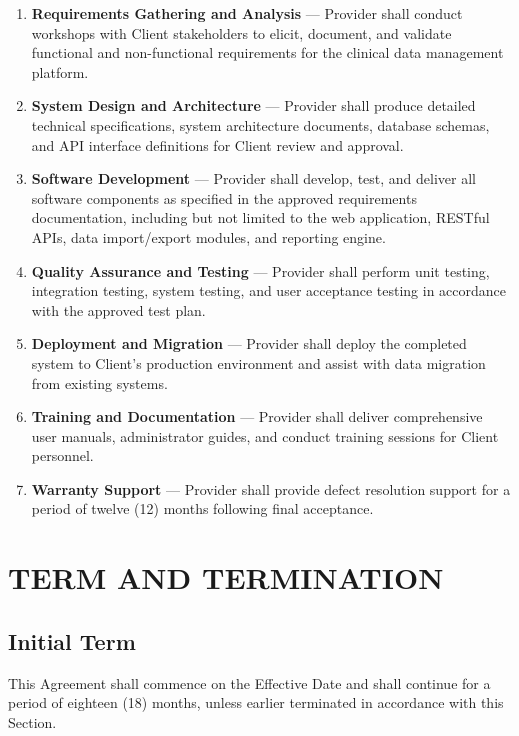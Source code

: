 \documentclass[
    language=english,
    doctype=contract,
    institution=none,
]{../../omnilatex}
\begin{document}
\begin{enumerate}
    \item \textbf{Requirements Gathering and Analysis} --- Provider shall conduct workshops with Client stakeholders to elicit, document, and validate functional and non-functional requirements for the clinical data management platform.

    \item \textbf{System Design and Architecture} --- Provider shall produce detailed technical specifications, system architecture documents, database schemas, and API interface definitions for Client review and approval.

    \item \textbf{Software Development} --- Provider shall develop, test, and deliver all software components as specified in the approved requirements documentation, including but not limited to the web application, RESTful APIs, data import/export modules, and reporting engine.

    \item \textbf{Quality Assurance and Testing} --- Provider shall perform unit testing, integration testing, system testing, and user acceptance testing in accordance with the approved test plan.

    \item \textbf{Deployment and Migration} --- Provider shall deploy the completed system to Client's production environment and assist with data migration from existing systems.

    \item \textbf{Training and Documentation} --- Provider shall deliver comprehensive user manuals, administrator guides, and conduct training sessions for Client personnel.

    \item \textbf{Warranty Support} --- Provider shall provide defect resolution support for a period of twelve (12) months following final acceptance.
\end{enumerate}

\section{TERM AND TERMINATION}

\subsection{Initial Term}
This Agreement shall commence on the Effective Date and shall continue for a period of eighteen (18) months, unless earlier terminated in accordance with this Section.
\end{document}
